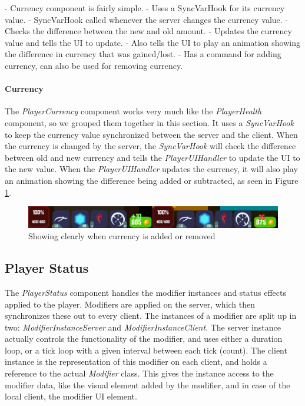    - Currency component is fairly simple. 
        - Uses a SyncVarHook for its currency value. 
            - SyncVarHook called whenever the server changes the currency value. 
            - Checks the difference between the new and old amount. 
            - Updates the currency value and tells the UI to update.
            - Also tells the UI to play an animation showing the difference in currency that was gained/lost.
        - Has a command for adding currency, can also be used for removing currency.
\paragraph{Currency}
The \emph{PlayerCurrency} component works very much like the \emph{PlayerHealth} component, so we grouped them together in this section. It uses a \emph{SyncVarHook} to keep the currency value synchronized between the server and the client. When the currency is changed by the server, the \emph{SyncVarHook} will check the difference between old and new currency and tells the \emph{PlayerUIHandler} to update the UI to the new value. When the \emph{PlayerUIHandler} updates the currency, it will also play an animation showing the difference being added or subtracted, as seen in Figure \ref{fig:addCurrency}.

\begin{figure}[tbph]
  \centering
  \includegraphics[width=\textwidth]{images/CurrencyChange}
  \caption[Example adding and subtracting currency]{Showing clearly when currency is added or removed}
  \label{fig:addCurrency}
\end{figure}


\subsection{Player Status}
The \emph{PlayerStatus} component handles the modifier instances and status effects applied to the player. Modifiers are applied on the server, which then synchronizes these out to every client. The instances of a modifier are split up in two: \emph{ModifierInstanceServer} and \emph{ModifierInstanceClient}. The server instance actually controls the functionality of the modifier, and uses either a duration loop, or a tick loop with a given interval between each tick (count). The client instance is the representation of this modifier on each client, and holds a reference to the actual \emph{Modifier} class. This gives the instance access to the modifier data, like the visual element added by the modifier, and in case of the local client, the modifier UI element. 
 
